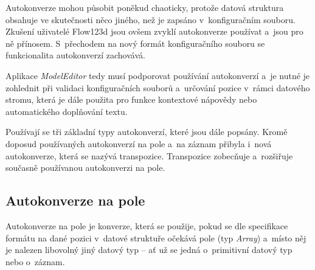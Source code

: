 \documentclass[FM,bw,DP]{tulthesis}
\begin{document}
Autokonverze mohou působit poněkud chaoticky, protože datová struktura obsahuje ve skutečnosti něco jiného, než je zapsáno v~konfiguračním souboru. Zkušení uživatelé Flow123d jsou ovšem zvyklí autokonverze používat a~jsou pro ně přínosem. S~přechodem na nový formát konfiguračního souboru se funkcionalita autokonverzí zachovává.

Aplikace \textit{ModelEditor} tedy musí podporovat používání autokonverzí a~je nutné je zohlednit při validaci konfiguračních souborů a~určování pozice v~rámci datového stromu, která je dále použita pro funkce kontextové nápovědy nebo automatického doplňování textu. 

Používají se tři základní typy autokonverzí, které jsou dále popsány. Kromě doposud používaných autokonverzí na pole a~na záznam přibyla i~nová autokonverze, která se nazývá transpozice. Transpozice zobecňuje a~rozšiřuje současně používanou autokonverzi na pole.

\subsection{Autokonverze na pole}
\label{sec:analyza-autokonverze-pole}

\lstset{style=short}

Autokonverze na pole je konverze, která se použije, pokud se dle specifikace formátu na dané pozici v~datové struktuře očekává pole (typ \textit{Array}) a~místo něj je nalezen libovolný jiný datový typ -- ať už se jedná o~primitivní datový typ nebo o~záznam.
\end{document}
